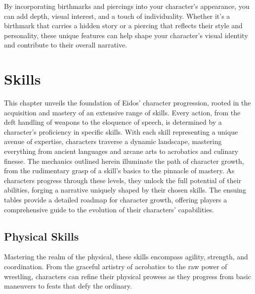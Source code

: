 By incorporating birthmarks and piercings into your character's
appearance, you can add depth, visual interest, and a touch of
individuality. Whether it's a birthmark that carries a hidden story or a
piercing that reflects their style and personality, these unique
features can help shape your character's visual identity and contribute
to their overall narrative.

\hypertarget{skills}{%
\section{Skills}\label{skills}}

This chapter unveils the foundation of Eidos' character progression,
rooted in the acquisition and mastery of an extensive range of skills.
Every action, from the deft handling of weapons to the eloquence of
speech, is determined by a character's proficiency in specific skills.
With each skill representing a unique avenue of expertise, characters
traverse a dynamic landscape, mastering everything from ancient
languages and arcane arts to acrobatics and culinary finesse. The
mechanics outlined herein illuminate the path of character growth, from
the rudimentary grasp of a skill's basics to the pinnacle of mastery. As
characters progress through these levels, they unlock the full potential
of their abilities, forging a narrative uniquely shaped by their chosen
skills. The ensuing tables provide a detailed roadmap for character
growth, offering players a comprehensive guide to the evolution of their
characters' capabilities.

\hypertarget{physical-skills}{%
\subsection{Physical Skills}\label{physical-skills}}

Mastering the realm of the physical, these skills encompass agility,
strength, and coordination. From the graceful artistry of acrobatics to
the raw power of wrestling, characters can refine their physical prowess
as they progress from basic maneuvers to feats that defy the ordinary.

